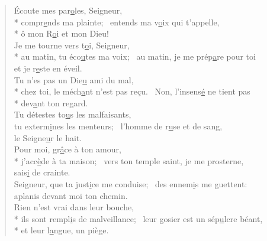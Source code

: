 
\begin{verse}
Écoute mes par\underline{o}les, Seigneur, \\*
compr\underline{e}nds ma plainte;~\psalmstar
{}entends ma v\underline{o}ix qui t’appelle, \\*
ô mon R\underline{o}i et mon Dieu! \\

Je me tourne vers t\underline{o}i, Seigneur, \\*
au matin, tu éco\underline{u}tes ma voix;~\psalmstar
au matin, je me prép\underline{a}re pour toi \\
et je r\underline{e}ste en éveil. \\

Tu n’es pas un Die\underline{u} ami du mal, \\*
chez toi, le méch\underline{a}nt n’est pas reçu.~\psalmstar
{}Non, l’insens\underline{é} ne tient pas \\*
dev\underline{a}nt ton regard. \\

Tu détestes to\underline{u}s les malfaisants, \\
tu exterm\underline{i}nes les menteurs;~\psalmstar
l’homme de r\underline{u}se et de sang, \\
le Seigne\underline{u}r le hait. \\

Pour moi, gr\underline{â}ce à ton amour, \\*
j’acc\underline{è}de à ta maison;~\psalmstar
vers ton temple saint, je me prosterne, \\
sais\underline{i} de crainte. \\

Seigneur, que ta just\underline{i}ce me conduise;~\psalmstar
des ennem\underline{i}s me guettent: \\
aplanis devant moi ton chemin. \\

Rien n’est vrai dans leur bouche, \\*
ils sont rempl\underline{i}s de malveillance;~\psalmstar
leur gosier est un sép\underline{u}lcre béant, \\*
et leur l\underline{a}ngue, un piège. \\


\end{verse}
